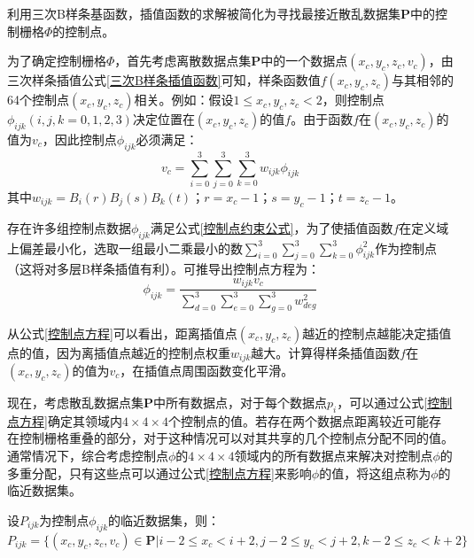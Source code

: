 利用三次B样条基函数，插值函数的求解被简化为寻找最接近散乱数据集$ \mathbf{P} $中的控制栅格$ \Phi $的控制点。

为了确定控制栅格$ \Phi $，首先考虑离散数据点集$ \mathbf{P} $中的一个数据点$ \left( x_{c}, y_{c}, z_{c}, v_{c} \right) $，由三次样条插值公式\ref{三次B样条插值函数}可知，样条函数值$ f\left( x_{c}, y_{c}, z_{c} \right) $与其相邻的64个控制点$ \left( x_{c}, y_{c}, z_{c} \right) $相关。例如：假设$ 1 \leq x_{c}, y_{c}, z_{c} < 2 $，则控制点$ \phi_{ijk} \left( i,j,k = 0,1,2,3 \right) $决定位置在$ \left( x_{c}, y_{c}, z_{c} \right) $的值$ f $。由于函数$f$在$ \left( x_{c}, y_{c}, z_{c} \right) $的值为$ v_{c} $，因此控制点$ \phi_{ijk} $必须满足：
\begin{equation}
    v_{c} = \sum_{i=0}^{3}\sum_{j=0}^{3}\sum_{k=0}^{3} w_{ijk} \phi_{ijk}
    \label{控制点约束公式}
\end{equation}
其中$ w_{ijk} = B_{i}(r)B_{j}(s)B_{k}(t) $；$ r=x_{c}-1 $；$ s=y_{c}-1 $；$ t=z_{c}-1 $。

存在许多组控制点数据$ \phi_{ijk} $满足公式\ref{控制点约束公式}，为了使插值函数$ f $在定义域上偏差最小化，选取一组最小二乘最小的数$ \sum_{i=0}^{3}\sum_{j=0}^{3}\sum_{k=0}^{3} \phi_{ijk}^{2} $作为控制点（这将对多层B样条插值有利）。可推导出控制点方程为：
\begin{equation}
    \phi_{ijk} = \frac{w_{ijk}v_{c}}{\sum_{d=0}^{3}\sum_{e=0}^{3}\sum_{g=0}^{3}w_{deg}^{2}}
    \label{控制点方程}
\end{equation}

从公式\ref{控制点方程}可以看出，距离插值点$ \left( x_{c}, y_{c}, z_{c} \right) $越近的控制点越能决定插值点的值，因为离插值点越近的控制点权重$ w_{ijk} $越大。计算得样条插值函数$ f $在$ \left( x_{c}, y_{c}, z_{c} \right) $的值为$ v_{c} $，在插值点周围函数变化平滑。

现在，考虑散乱数据点集$ \mathbf{P} $中所有数据点，对于每个数据点$ p_{i} $，可以通过公式\ref{控制点方程}确定其领域内$ 4 \times 4 \times 4 $个控制点的值。若存在两个数据点距离较近可能存在控制栅格重叠的部分，对于这种情况可以对其共享的几个控制点分配不同的值。通常情况下，综合考虑控制点$ \phi $的$ 4 \times 4 \times 4 $领域内的所有数据点来解决对控制点$ \phi $的多重分配，只有这些点可以通过公式\ref{控制点方程}来影响$ \phi $的值，将这组点称为$ \phi $的临近数据集。

设$ P_{ijk} $为控制点$ \phi_{ijk} $的临近数据集，则：
\begin{equation*}
    P_{ijk} = \{ \left( x_{c}, y_{c}, z_{c}, v_{c} \right) \in \mathbf{P} | i-2 \leq x_{c} < i+2, j-2 \leq y_{c} < j+2, k-2 \leq z_{c} < k+2 \}
\end{equation*}

